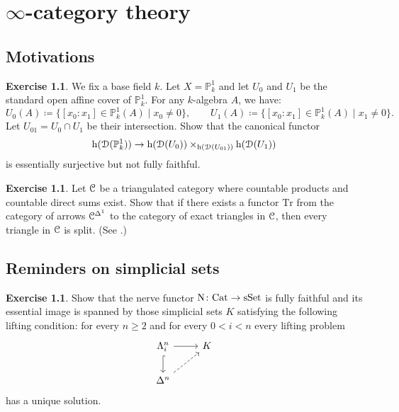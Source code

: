 \documentclass[10pt,a4paper,reqno,oneside]{book} %
\theoremstyle{plain}
\theoremstyle{definition}
\newtheorem{exercise}[thm]{Exercise}
\theoremstyle{remark}
\numberwithin{equation}{section}
\begin{document}
\chapter{$\infty$-category theory}

\section{Motivations}

\begin{exercise}
	We fix a base field $k$.
	Let $X = \mathbb P^1_k$ and let $U_0$ and $U_1$ be the standard open affine cover of $\mathbb P^1_k$.
	For any $k$-algebra $A$, we have:
	\[ U_0(A) \coloneqq \{ [x_0:x_1] \in \mathbb P^1_k(A) \mid x_0 \ne 0\},  \qquad U_1(A) \coloneqq \{[x_0:x_1] \in \mathbb P^1_k(A) \mid x_1 \ne 0\} . \]
	Let $U_{01} = U_0 \cap U_1$ be their intersection.
	Show that the canonical functor
	\[ \mathrm h( \mathcal D(\mathbb P^1_k) ) \to \mathrm h( \mathcal D( U_0 ) ) \times_{\mathrm h( \mathcal D( U_{01} ) )} \mathrm h( \mathcal D( U_1 ) )  \]
	is essentially surjective but not fully faithful.
\end{exercise}


\begin{exercise}
	Let $\mathcal C$ be a triangulated category where countable products and countable direct sums exist.
	Show that if there exists a functor $\mathrm{Tr}$ from the category of arrows $\mathcal C^{\Delta^1}$ to the category of exact triangles in $\mathcal C$, then every triangle in $\mathcal C$ is split.
	(See \cite[Proposition II.1.2.13]{Verdier_Triangulated_categories}.)
\end{exercise}

\section{Reminders on simplicial sets}

\begin{exercise}
	Show that the nerve functor $\mathrm N \colon \mathrm{Cat} \to \mathrm{sSet}$ is fully faithful and its essential image is spanned by those simplicial sets $K$ satisfying the following lifting condition: for every $n \ge 2$ and for every $0 < i < n$ every lifting problem
	\[ \begin{tikzcd}
		\Lambda^n_i \arrow{r} \arrow[hook]{d} & K \\
		\Delta^n \arrow[dashed]{ur}
	\end{tikzcd} \]
	has a unique solution.
\end{exercise}
\end{document}
